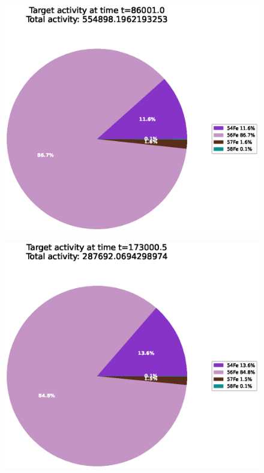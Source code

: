 \begin{figure}[!htb]
\centering
\includegraphics[width=0.8\linewidth]{chapters/activity_code/fe-activity-v2/target-activity/0166_86001.eps}
\caption{}
\label{fig:activity-v2-target-activity-86001s}
\end{figure}


\begin{figure}[!htb]
\centering
\includegraphics[width=0.8\linewidth]{chapters/activity_code/fe-activity-v2/target-activity/0233_173000.eps}
\caption{}
\label{fig:activity-v2-target-activity-173000s}
\end{figure}

